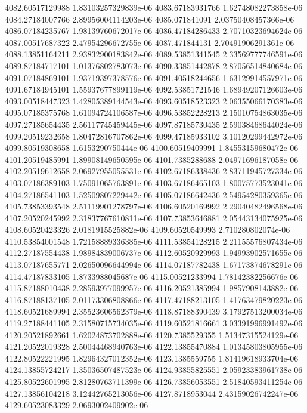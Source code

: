 {4082.60517129988 1.83103257329839e-06
4083.67183931766 1.62748082273858e-06
4084.27184007766 2.89956004114203e-06
4085.071841091 2.03750408457366e-06
4086.07184235767 1.98139760672017e-06
4086.47184286433 2.70710323694624e-06
4087.00517687322 2.47954296672755e-06
4087.471844131 2.70491906291361e-06
4088.13851164211 2.93832900183842e-06
4089.53851341545 2.33569777746591e-06
4089.87184717101 1.01376802783073e-06
4090.33851442878 2.87056514840684e-06
4091.07184869101 1.93719397378576e-06
4091.40518244656 1.63129914557971e-06
4091.67184945101 1.55937677899119e-06
4092.53851721546 1.68949207126603e-06
4093.00518447323 1.42805389144543e-06
4093.60518523323 2.06355066170383e-06
4095.07185375768 1.61094724106587e-06
4096.53852228213 2.15010754863035e-06
4097.27185654435 2.56117745459445e-06
4097.87185730435 2.59038468644024e-06
4099.20519232658 1.80472816707862e-06
4099.47185933102 3.10120299442972e-06
4099.80519308658 1.6153290750444e-06
4100.60519409991 1.84553159680472e-06
4101.20519485991 1.89908149650595e-06
4101.7385288688 2.04971696187058e-06
4102.20519612658 2.06927955055531e-06
4102.67186338436 2.83711945727334e-06
4103.07186389103 1.75091065763891e-06
4103.67186465103 1.80075773523041e-06
4104.27186541103 1.52509807229442e-06
4105.07186642436 2.54954280359365e-06
4105.73853393548 2.51119901278797e-06
4106.60520169992 2.29040482496568e-06
4107.20520245992 2.31837767610811e-06
4107.73853646881 2.05443134075925e-06
4108.60520423326 2.0181915525882e-06
4109.60520549993 2.710280802074e-06
4110.53854001548 1.72158889336385e-06
4111.53854128215 2.21155576807434e-06
4112.27187554438 1.98984839006737e-06
4112.60520929993 1.94993902571655e-06
4113.07187655771 2.02650096644994e-06
4114.07187782438 1.67173874678291e-06
4114.47187833105 1.8733988045687e-06
4115.00521233994 1.78142382256676e-06
4115.87188010438 2.28593977099957e-06
4116.20521385994 1.9857908143882e-06
4116.87188137105 2.01173306808866e-06
4117.47188213105 1.41763479820223e-06
4118.60521689994 2.35523606562379e-06
4118.87188390439 3.17927513200034e-06
4119.27188441105 2.31580715734035e-06
4119.60521816661 3.03391996991492e-06
4120.20521892661 1.62024873702888e-06
4120.7385529355 1.51347315524129e-06
4121.20522019328 2.50044468940763e-06
4122.13855470884 1.01345803805955e-06
4122.80522221995 1.82964327012352e-06
4123.1385559755 1.81419618933704e-06
4124.13855724217 1.35036507487523e-06
4124.93855825551 2.05923383961738e-06
4125.80522601995 2.81280763711399e-06
4126.73856053551 2.51840593411254e-06
4127.13856104218 3.12442765213056e-06
4127.8718953044 2.43159026742247e-06
4129.60523083329 2.0693002409902e-06
}
